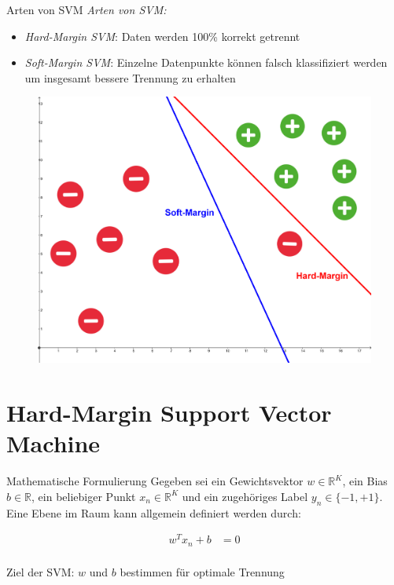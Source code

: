 \documentclass[ngerman]{beamer}
\begin{document}
\begin{frame}{Arten von SVM}
	\emph{Arten von SVM:}
	\begin{itemize}
		\item \emph{Hard-Margin SVM}: Daten werden 100\% korrekt getrennt
		\item \emph{Soft-Margin SVM}: Einzelne Datenpunkte können falsch klassifiziert werden um insgesamt bessere Trennung zu erhalten
	\end{itemize}

	\begin{center}
		\begin{figure}
			\includegraphics[width=\textwidth,height=0.6\textheight,keepaspectratio]{assets/hard_vs_soft_margin.png}
		\end{figure}
	\end{center}

\end{frame}

\section{Hard-Margin Support Vector Machine}


\begin{frame}{Mathematische Formulierung}
Gegeben sei ein Gewichtsvektor $w \in \mathbb{R}^{K}$, ein Bias $b \in \mathbb{R}$, ein beliebiger Punkt $x_{n} \in \mathbb{R}^{K}$ und ein zugehöriges Label $y_{n} \in \{-1, +1\}$. Eine Ebene im Raum kann allgemein definiert werden durch:

\begin{equation*} \label{plane_eq}
	\begin{aligned}
		w^{T} x_{n} + b &= 0 \\
	\end{aligned}
\end{equation*}

Ziel der SVM: $w$ und $b$ bestimmen für optimale Trennung

\end{frame}
\end{document}
